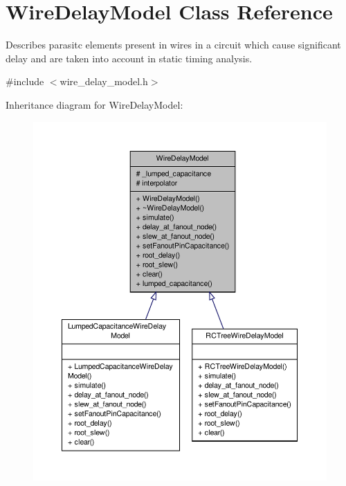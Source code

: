 \hypertarget{classWireDelayModel}{\section{Wire\-Delay\-Model Class Reference}
\label{classWireDelayModel}
}


Describes parasitc elements present in wires in a circuit which cause significant delay and are taken into account in static timing analysis.  




{\ttfamily \#include $<$wire\-\_\-delay\-\_\-model.\-h$>$}



Inheritance diagram for Wire\-Delay\-Model\-:\nopagebreak
\begin{figure}[H]
\begin{center}
\leavevmode
\includegraphics[width=350pt]{classWireDelayModel__inherit__graph}
\end{center}
\end{figure}


